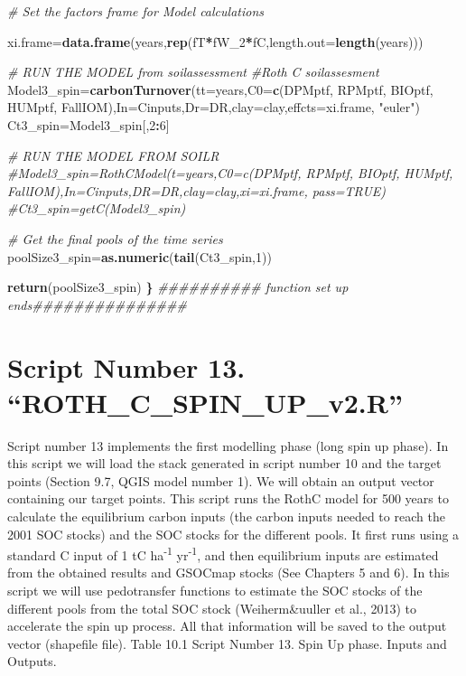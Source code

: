 \documentclass[
  10pt,
  b5paper,
]{book}
\newenvironment{Shaded}{\begin{snugshade}}{\end{snugshade}}
\newcommand{\CommentTok}[1]{\textcolor[rgb]{0.56,0.35,0.01}{\textit{#1}}}
\newcommand{\DataTypeTok}[1]{\textcolor[rgb]{0.13,0.29,0.53}{#1}}
\newcommand{\DecValTok}[1]{\textcolor[rgb]{0.00,0.00,0.81}{#1}}
\newcommand{\ErrorTok}[1]{\textcolor[rgb]{0.64,0.00,0.00}{\textbf{#1}}}
\newcommand{\KeywordTok}[1]{\textcolor[rgb]{0.13,0.29,0.53}{\textbf{#1}}}
\newcommand{\NormalTok}[1]{#1}
\newcommand{\OperatorTok}[1]{\textcolor[rgb]{0.81,0.36,0.00}{\textbf{#1}}}
\newcommand{\StringTok}[1]{\textcolor[rgb]{0.31,0.60,0.02}{#1}}
\begin{document}
\begin{Shaded}
\begin{Highlighting}[]
\CommentTok{# Set the factors frame for Model calculations}

\NormalTok{xi.frame=}\KeywordTok{data.frame}\NormalTok{(years,}\KeywordTok{rep}\NormalTok{(fT}\OperatorTok{*}\NormalTok{fW_}\DecValTok{2}\OperatorTok{*}\NormalTok{fC,}\DataTypeTok{length.out=}\KeywordTok{length}\NormalTok{(years)))}

\CommentTok{# RUN THE MODEL from soilassessment}
\CommentTok{#Roth C soilassesment}
\NormalTok{Model3_spin=}\KeywordTok{carbonTurnover}\NormalTok{(}\DataTypeTok{tt=}\NormalTok{years,}\DataTypeTok{C0=}\KeywordTok{c}\NormalTok{(DPMptf, RPMptf, BIOptf, HUMptf, FallIOM),}\DataTypeTok{In=}\NormalTok{Cinputs,}\DataTypeTok{Dr=}\NormalTok{DR,}\DataTypeTok{clay=}\NormalTok{clay,}\DataTypeTok{effcts=}\NormalTok{xi.frame, }\StringTok{"euler"}\NormalTok{) }
\NormalTok{Ct3_spin=Model3_spin[,}\DecValTok{2}\OperatorTok{:}\DecValTok{6}\NormalTok{]}

\CommentTok{# RUN THE MODEL FROM SOILR}
\CommentTok{#Model3_spin=RothCModel(t=years,C0=c(DPMptf, RPMptf, BIOptf, HUMptf, FallIOM),In=Cinputs,DR=DR,clay=clay,xi=xi.frame, pass=TRUE) }
\CommentTok{#Ct3_spin=getC(Model3_spin)}

\CommentTok{# Get the final pools of the time series}
\NormalTok{poolSize3_spin=}\KeywordTok{as.numeric}\NormalTok{(}\KeywordTok{tail}\NormalTok{(Ct3_spin,}\DecValTok{1}\NormalTok{))}

\KeywordTok{return}\NormalTok{(poolSize3_spin)}
\ErrorTok{\}}
\CommentTok{########## function set up ends###############}
\end{Highlighting}
\end{Shaded}

\hypertarget{script-number-13.-roth_c_spin_up_v2.r}{%
\section{Script Number 13. ``ROTH\_C\_SPIN\_UP\_v2.R''}\label{script-number-13.-roth_c_spin_up_v2.r}}

Script number 13 implements the first modelling phase (long spin up phase). In this script we will load the stack generated in script number 10 and the target points (Section 9.7, QGIS model number 1). We will obtain an output vector containing our target points. This script runs the RothC model for 500 years to calculate the equilibrium carbon inputs (the carbon inputs needed to reach the 2001 SOC stocks) and the SOC stocks for the different pools. It first runs using a standard C input of 1 tC ha\textsuperscript{-1} yr\textsuperscript{-1}, and then equilibrium inputs are estimated from the obtained results and GSOCmap stocks (See Chapters 5 and 6). In this script we will use pedotransfer functions to estimate the SOC stocks of the different pools from the total SOC stock (Weiherm\&uuller et al., 2013) to accelerate the spin up process. All that information will be saved to the output vector (shapefile file).
Table 10.1 Script Number 13. Spin Up phase. Inputs and Outputs.
\end{document}
